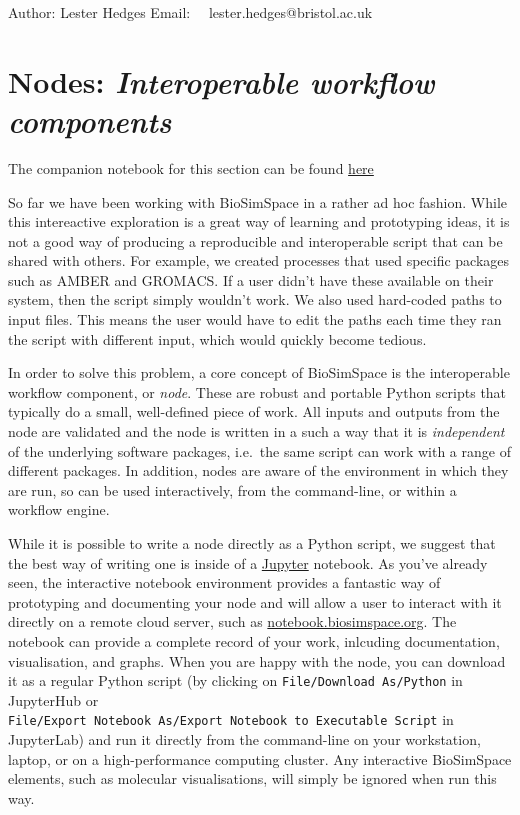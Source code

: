 Author: Lester Hedges Email:~~ lester.hedges@bristol.ac.uk

\hypertarget{nodes-interoperable-workflow-components}{%
\section{\texorpdfstring{Nodes: \emph{Interoperable workflow
components}}{Nodes: Interoperable workflow components}}\label{nodes-interoperable-workflow-components}}

The companion notebook for this section can be found
\href{https://github.com/michellab/BioSimSpaceTutorials/blob/4844562e7d2cd0b269cead56562ec16a3dfaef7c/01_introduction/04_writing_nodes.ipynb}{here}

So far we have been working with BioSimSpace in a rather ad hoc fashion.
While this intereactive exploration is a great way of learning and
prototyping ideas, it is not a good way of producing a reproducible and
interoperable script that can be shared with others. For example, we
created processes that used specific packages such as AMBER and GROMACS.
If a user didn't have these available on their system, then the script
simply wouldn't work. We also used hard-coded paths to input files. This
means the user would have to edit the paths each time they ran the
script with different input, which would quickly become tedious.

In order to solve this problem, a core concept of BioSimSpace is the
interoperable workflow component, or \emph{node}. These are robust and
portable Python scripts that typically do a small, well-defined piece of
work. All inputs and outputs from the node are validated and the node is
written in a such a way that it is \emph{independent} of the underlying
software packages, i.e.~the same script can work with a range of
different packages. In addition, nodes are aware of the environment in
which they are run, so can be used interactively, from the command-line,
or within a workflow engine.

While it is possible to write a node directly as a Python script, we
suggest that the best way of writing one is inside of a
\href{http://jupyter.org}{Jupyter} notebook. As you've already seen, the
interactive notebook environment provides a fantastic way of prototyping
and documenting your node and will allow a user to interact with it
directly on a remote cloud server, such as
\href{https://notebook.biosimspace.org}{notebook.biosimspace.org}. The
notebook can provide a complete record of your work, inlcuding
documentation, visualisation, and graphs. When you are happy with the
node, you can download it as a regular Python script (by clicking on
\texttt{File/Download\ As/Python} in JupyterHub or
\texttt{File/Export\ Notebook\ As/Export\ Notebook\ to\ Executable\ Script}
in JupyterLab) and run it directly from the command-line on your
workstation, laptop, or on a high-performance computing cluster. Any
interactive BioSimSpace elements, such as molecular visualisations, will
simply be ignored when run this way.

